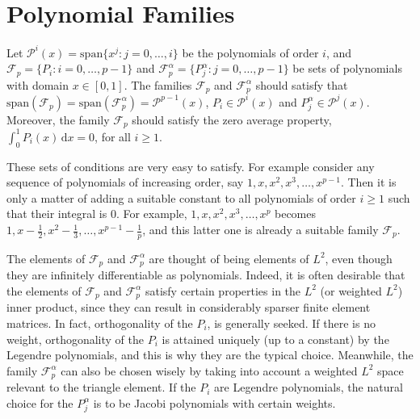 \section{Polynomial Families}
\label{app:GeneratingFamilies}

Let $\mathcal{P}^i(x)=\mathrm{span}\{x^j:j=0,\ldots,i\}$ be the polynomials of order $i$, and $\mathcal{F}_p=\{P_i:i=0,\ldots,p-1\}$ and $\mathcal{F}_p^\alpha=\{P_j^\alpha:j=0,\ldots,p-1\}$ be sets of polynomials with domain $x\in[0,1]$. 
The families $\mathcal{F}_p$ and $\mathcal{F}_p^\alpha$ should satisfy that $\mathrm{span}(\mathcal{F}_p)=\mathrm{span}(\mathcal{F}_p^\alpha)=\mathcal{P}^{p-1}(x)$, $P_i\in\mathcal{P}^i(x)$ and $P_j^\alpha\in\mathcal{P}^j(x)$.
Moreover, the family $\mathcal{F}_p$ should satisfy the zero average property, $\int_0^1 P_i(x)\,\mathrm{d}x=0$, for all $i\geq1$.

These sets of conditions are very easy to satisfy. 
For example consider any sequence of polynomials of increasing order, say $1,x,x^2,x^3,\ldots,x^{p-1}$.
Then it is only a matter of adding a suitable constant to all polynomials of order $i\geq1$ such that their integral is $0$.
For example, $1,x,x^2,x^3,\ldots,x^p$ becomes $1,x-\frac{1}{2},x^2-\frac{1}{3},\ldots,x^{p-1}-\frac{1}{p}$, and this latter one is already a suitable family $\mathcal{F}_p$.

The elements of $\mathcal{F}_p$ and $\mathcal{F}_p^\alpha$ are thought of being elements of $L^2$, even though they are infinitely differentiable as polynomials.
Indeed, it is often desirable that the elements of $\mathcal{F}_p$ and $\mathcal{F}_p^\alpha$ satisfy certain properties in the $L^2$ (or weighted $L^2$) inner product, since they can result in considerably sparser finite element matrices.
In fact, orthogonality of the $P_i$, is generally seeked.
If there is no weight, orthogonality of the $P_i$ is attained uniquely (up to a constant) by the Legendre polynomials, and this is why they are the typical choice.
Meanwhile, the family $\mathcal{F}_p^\alpha$ can also be chosen wisely by taking into account a weighted $L^2$ space relevant to the triangle element.
If the $P_i$ are Legendre polynomials, the natural choice for the $P_j^\alpha$ is to be Jacobi polynomials with certain weights.


